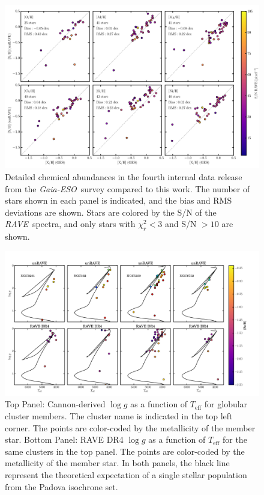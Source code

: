 \documentclass[preprint,trackchanges]{aastex}
\newcommand{\acronym}[1]{{\small{#1}}}
\newcommand{\project}[1]{\textsl{#1}}
\newcommand{\rave}{\project{\acronym{RAVE}}}
\newcommand{\ges}{\project{Gaia-ESO}}
\newcommand{\teff}{T_{\mathrm{eff}}}
\newcommand{\logg}{\log g}
\begin{document}
\begin{figure}[p]
\includegraphics[width=\textwidth]{figures/ges-abundances.pdf}
\caption{Detailed chemical abundances in the fourth internal data release from the \ges\ survey compared to this work.  The number of stars shown in each panel is indicated, and the bias and RMS deviations are shown. Stars are colored by the S/N of the \rave\ spectra, and only stars with $\chi_r^2 < 3$ and S/N $> 10$ are shown.\label{fig:ges-abundances}}
\end{figure}


\begin{figure}[p]
\includegraphics[width=\textwidth]{figures/HRD_GCs.pdf}
\caption{Top Panel: Cannon-derived $\logg$ as a function of $\teff$ for globular cluster members. The cluster name is indicated in the top left corner. The points are color-coded by the metallicity of the member star. Bottom Panel: RAVE DR4 $\logg$ as a function of $\teff$ for the same clusters in the top panel. The points are color-coded by the metallicity of the member star. In both panels, the black line represent the theoretical expectation of a single stellar population from the Padova isochrone set. \label{fig:globular-cluster-HRD}}
\end{figure}
\end{document}
